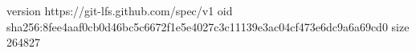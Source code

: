 version https://git-lfs.github.com/spec/v1
oid sha256:8fee4aaf0cb0d46bc5c6672f1e5e4027c3c11139e3ac04cf473e6dc9a6a69cd0
size 264827
